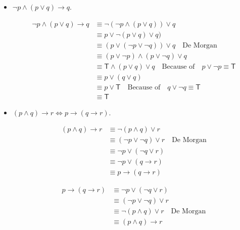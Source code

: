 \documentclass{article}
\begin{document}
\begin{itemize}
  \item $\lnot p \land (p \lor q) \to q$.
  
\begin{equation*}
  \begin{aligned}
    \lnot p \land (p \lor q) \to q &\equiv \lnot(\lnot p \land ( p \lor q )) \lor q \\
    &\equiv p \lor \lnot (p \lor q) \lor q) \\
    &\equiv (p \lor (\lnot p \lor \lnot q)) \lor q \quad \text{De Morgan}\\
    &\equiv (p \lor \lnot p) \land (p \lor \lnot q) \lor q\\
    &\equiv \mathsf{T} \land (p \lor q) \lor q \quad \text{Because of} \quad p \lor \lnot p \equiv \mathsf{T} \\
    &\equiv p \lor (q \lor q) \\
    &\equiv p \lor \mathsf{T} \quad \text{Because of} \quad q \lor \lnot q \equiv \mathsf{T} \\
    &\equiv \mathsf{T}
  \end{aligned}
\end{equation*}

  \item $(p \land q) \to r \Leftrightarrow p \to (q \to r) $.
  
\begin{equation*}
  \begin{aligned}
    (p \land q) \to r &\equiv \lnot (p \land q) \lor r\\
    &\equiv (\lnot p \lor \lnot q) \lor r \quad \text{De Morgan}\\
    &\equiv \lnot p \lor (\lnot q \lor r)\\
    &\equiv \lnot p \lor (q \to r)\\
    &\equiv p \to (q \to r)
  \end{aligned}
\end{equation*}

\begin{equation*}
  \begin{aligned}
    p \to (q \to r) &\equiv \lnot p \lor (\lnot q \lor r )\\
    &\equiv (\lnot p \lor \lnot q) \lor r\\
    &\equiv \lnot(p \land q) \lor r \quad \text{De Morgan}\\
    &\equiv (p \land q) \to r
  \end{aligned}
\end{equation*}
  

\end{itemize}
\end{document}
